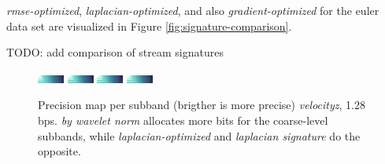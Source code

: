 \emph{rmse-optimized}, \emph{laplacian-optimized}, and also \emph{gradient-optimized} for the euler
data set are visualized in Figure \ref{fig:signature-comparison}. 

TODO: add comparison of stream signatures

\begin{figure}[h]
	\centering
	{\includegraphics[width=0.48\linewidth]{img/laplacian/SIG-(GREEDY)-(laplacian)-boiler.png}}
	{\includegraphics[width=0.48\linewidth]{img/laplacian/SIG-(GREEDY)-(laplacian)-diffusivity.png}}
	{\includegraphics[width=0.48\linewidth]{img/laplacian/SIG-(GREEDY)-(laplacian)-velocityz.png}}
	{\includegraphics[width=0.48\linewidth]{img/laplacian/SIG-(GREEDY)-(laplacian)-marschner-lobb.png}}
	\caption{Precision map per subband (brigther is more precise) \emph{velocityz}, 1.28 bps. \emph{by wavelet norm} allocates more bits for the coarse-level subbands, while \emph{laplacian-optimized} and \emph{laplacian signature} do the opposite.}
	\label{fig:laplacian-precision-comparison}
\end{figure}

